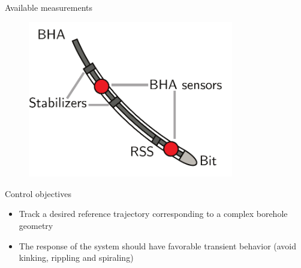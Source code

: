 \documentclass{beamer}
\begin{document}
\begin{frame}{Available measurements}
	\begin{figure}[ht]\centering
				\includegraphics[width=0.8\textwidth]{images/Sensors.pdf}
	\end{figure}
\end{frame}


\begin{frame}{Control objectives}
	\begin{itemize}\setlength\itemsep{1.5em}
		\item Track a desired reference trajectory corresponding to a complex borehole geometry
		\item The response of the system should have favorable transient behavior (avoid kinking, rippling and spiraling)
	\end{itemize}
\end{frame}
\end{document}
